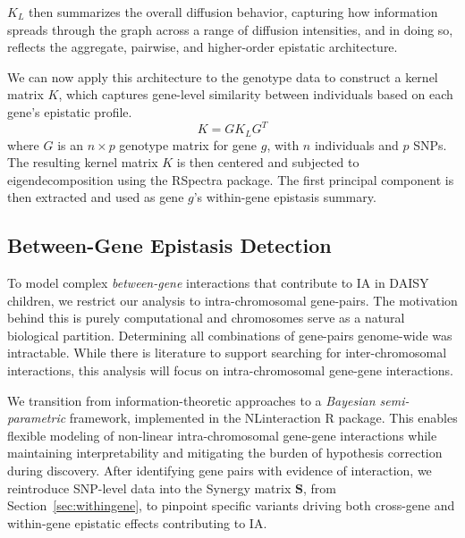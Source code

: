 \documentclass{article}\usepackage[]{graphicx}\usepackage[]{color}
\begin{document}
$K_L$ then summarizes the overall diffusion behavior, capturing how information spreads through the graph across a range of diffusion intensities, and in doing so, reflects the aggregate, pairwise, and higher-order epistatic architecture. 
\par
We can now apply this architecture to the genotype data to construct a kernel matrix $K$, which captures gene-level similarity between individuals based on each gene's epistatic profile.
\begin{equation}
K = GK_LG^T
\label{eq:K}
\end{equation}
where $G$ is an $n\times p$ genotype matrix for gene $g$, with $n$ individuals and $p$ SNPs. The resulting kernel matrix $K$ is then centered and subjected to eigendecomposition using the RSpectra package\cite{qiuRSpectraSolversLargescale2024}. The first principal component is then extracted and used as gene $g$'s within-gene epistasis summary.


\subsection{Between-Gene Epistasis Detection}
\label{sec:between-geen}
To model complex \textit{between-gene} interactions that contribute to IA in DAISY children, we restrict our analysis to intra-chromosomal gene-pairs. The motivation behind this is purely computational and chromosomes serve as a natural biological partition. Determining all combinations of gene-pairs genome-wide was intractable. While there is literature to support searching for inter-chromosomal interactions, this analysis will focus on intra-chromosomal gene-gene interactions.
\par
We transition from information-theoretic approaches to a \textit{Bayesian semi-parametric}\cite{antonelliEstimatingHealthEffects2019,walakiraDetectingGeneGene2022} framework, implemented in the NLinteraction\cite{antonelliEstimatingHealthEffects2019} R package. This enables flexible modeling of non-linear intra-chromosomal gene-gene interactions while maintaining interpretability and mitigating the burden of hypothesis correction during discovery. After identifying gene pairs with evidence of interaction, we reintroduce SNP-level data into the Synergy matrix $\mathbf{S}$, from Section~\ref{sec:withingene}, to pinpoint specific variants driving both cross-gene and within-gene epistatic effects contributing to IA.
\end{document}
